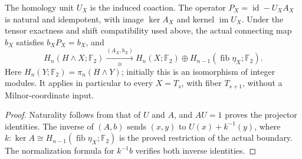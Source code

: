 \begin{proposition}
  \label{prop:h6-natural-tower-splitting}
  \leanok
  The homology unit $U_X$ is the induced coaction. The operator
  $P_X=\operatorname{id}-U_XA_X$ is natural and idempotent, with image
  $\ker A_X$ and kernel $\operatorname{im}U_X$.
  Under the tensor exactness and shift compatibility used above,
  the actual connecting map $b_X$ satisfies $b_XP_X=b_X$, and
  \[
    H_n(H\wedge X;\mathbb F_2)
      \xrightarrow[\cong]{(A_X,b_X)}
    H_n(X;\mathbb F_2)\oplus H_{n-1}(\operatorname{fib}\eta_X;\mathbb F_2).
  \]
  Here $H_n(Y;\mathbb F_2)=\pi_n(H\wedge Y)$; initially this is an
  isomorphism of integer modules. It applies in particular to every
  $X=T_s$, with fiber $T_{s+1}$, without a Milnor-coordinate input.
\end{proposition}
\begin{proof}
  Naturality follows from that of $U$ and $A$, and $AU=1$ proves the
  projector identities. The inverse of $(A,b)$ sends $(x,y)$ to
  $U(x)+k^{-1}(y)$, where $k:\ker A\cong H_{n-1}(\operatorname{fib}\eta_X;\mathbb F_2)$
  is the proved restriction of the actual boundary. The normalization
  formula for $k^{-1}b$ verifies both inverse identities.
  \leanok
\end{proof}

